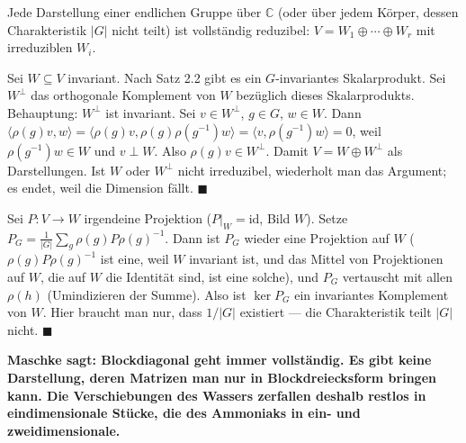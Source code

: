 \begin{merksatz}
Jede Darstellung einer endlichen Gruppe über $\mathbb C$ (oder über jedem Körper, dessen Charakteristik $|G|$ nicht teilt) ist vollständig reduzibel: $V = W_1\oplus\cdots\oplus W_r$ mit irreduziblen $W_i$.

Sei $W\subseteq V$ invariant. Nach Satz 2.2 gibt es ein $G$-invariantes Skalarprodukt. Sei $W^{\perp}$ das orthogonale Komplement von $W$ bezüglich dieses Skalarprodukts. Behauptung: $W^{\perp}$ ist invariant. Sei $v\in W^{\perp}$, $g\in G$, $w\in W$. Dann $\langle\rho(g)v, w\rangle = \langle\rho(g)v, \rho(g)\rho(g^{-1})w\rangle = \langle v, \rho(g^{-1})w\rangle = 0$, weil $\rho(g^{-1})w\in W$ und $v\perp W$. Also $\rho(g)v\in W^{\perp}$. Damit $V = W\oplus W^{\perp}$ als Darstellungen. Ist $W$ oder $W^{\perp}$ nicht irreduzibel, wiederholt man das Argument; es endet, weil die Dimension fällt. $\blacksquare$

Sei $P\colon V\to W$ irgendeine Projektion ($P|_W = \mathrm{id}$, Bild $W$). Setze $P_G = \frac1{|G|}\sum_{g}\rho(g)P\rho(g)^{-1}$. Dann ist $P_G$ wieder eine Projektion auf $W$ ($\rho(g)P\rho(g)^{-1}$ ist eine, weil $W$ invariant ist, und das Mittel von Projektionen auf $W$, die auf $W$ die Identität sind, ist eine solche), und $P_G$ vertauscht mit allen $\rho(h)$ (Umindizieren der Summe). Also ist $\ker P_G$ ein invariantes Komplement von $W$. Hier braucht man nur, dass $1/|G|$ existiert --- die Charakteristik teilt $|G|$ nicht. $\blacksquare$

\begin{center}
\begin{minipage}{0.9\textwidth}
\textbf{Maschke sagt: Blockdiagonal geht immer vollständig. Es gibt keine Darstellung, deren Matrizen man nur in Blockdreiecksform bringen kann. Die Verschiebungen des Wassers zerfallen deshalb restlos in eindimensionale Stücke, die des Ammoniaks in ein- und zweidimensionale.}
\end{minipage}
\end{center}


\end{merksatz}
